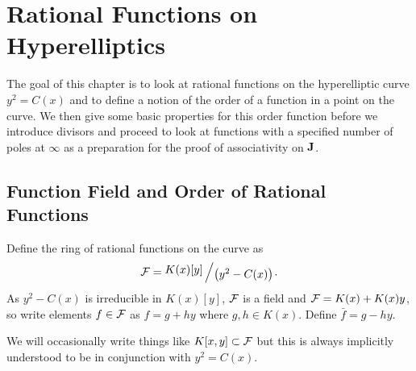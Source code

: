 \documentclass[english,11pt,a4paper]{article}
\begin{document}



\newpage

\section{Rational Functions on Hyperelliptics}

The goal of this chapter is to look at rational functions on the hyperelliptic curve $y^2 = C(x)$ and to define a notion of the order of a function in a point on the curve. We then give some basic properties for this order function before we introduce divisors and proceed to look at functions with a specified number of poles at $\infty$ as a preparation for the proof of associativity on $\mathbf{J}$.

\subsection{Function Field and Order of Rational Functions}

\begin{defin}
  Define the ring of rational functions on the curve as
  \begin{align*}
    \F = \bigslant{K(x)[y]}{\big(y^2-C(x)\big)}.
  \end{align*}
  As $y^2-C(x)$ is irreducible in $K(x)[y]$, $\mathcal{F}$ is a field
  and $\mathcal{F} = K(x) + K(x) y$, so write elements $f \in \mathcal{F}$ as $f = g + hy$ where $g,h \in K(x)$. Define $\bar f = g - hy$.

  We will occasionally write things like $K[x,y] \subset \mathcal{F}$ but this is always implicitly understood to be in conjunction with $y^2=C(x)$.
\end{defin}

\vspace{3mm}
\end{document}
